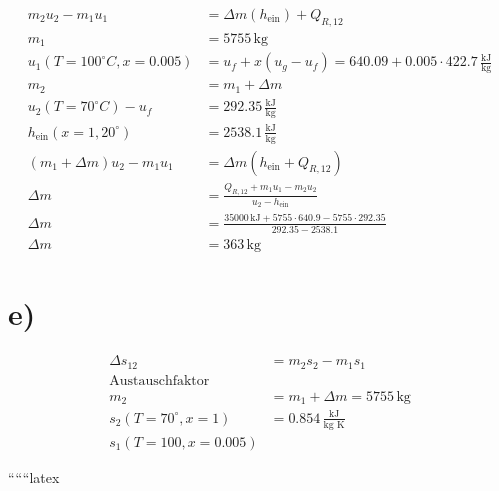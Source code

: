 \begin{align*}
    m_2 u_2 - m_1 u_1 &= \Delta m (h_{\text{ein}}) + Q_{R,12} \\
    m_1 &= 5755 \, \text{kg} \\
    u_1(T = 100^\circ C, x = 0.005) &= u_f + x (u_g - u_f) = 640.09 + 0.005 \cdot 422.7 \, \frac{\text{kJ}}{\text{kg}} \\
    m_2 &= m_1 + \Delta m \\
    u_2 (T = 70^\circ C) - u_f &= 292.35 \, \frac{\text{kJ}}{\text{kg}} \\
    h_{\text{ein}} (x = 1, 20^\circ) &= 2538.1 \, \frac{\text{kJ}}{\text{kg}} \\
    (m_1 + \Delta m) u_2 - m_1 u_1 &= \Delta m (h_{\text{ein}} + Q_{R,12}) \\
    \Delta m &= \frac{Q_{R,12} + m_1 u_1 - m_2 u_2}{u_2 - h_{\text{ein}}} \\
    \Delta m &= \frac{35000 \, \text{kJ} + 5755 \cdot 640.9 - 5755 \cdot 292.35}{292.35 - 2538.1} \\
    \Delta m &= 363 \, \text{kg}
\end{align*}

\section*{e)}

\begin{align*}
    \Delta s_{12} &= m_2 s_2 - m_1 s_1 \\
    \text{Austauschfaktor} \\
    m_2 &= m_1 + \Delta m = 5755 \, \text{kg} \\
    s_2 (T = 70^\circ, x = 1) &= 0.854 \, \frac{\text{kJ}}{\text{kg K}} \\
    s_1 (T = 100, x = 0.005)
\end{align*}

``````latex


